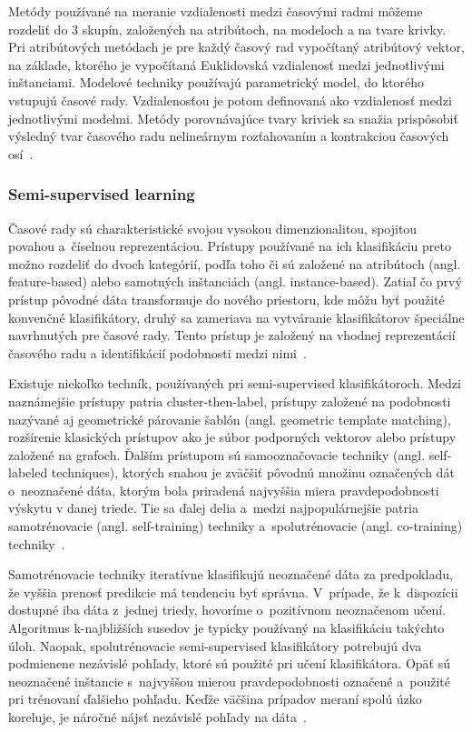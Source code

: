 \documentclass[a4paper,twoside,slovak,12pt]{article}
\begin{document}
Metódy používané na meranie vzdialenosti medzi časovými radmi môžeme rozdeliť do
3 skupín, založených na atribútoch, na modeloch a na tvare krivky. Pri
atribútových metódach je pre každý časový rad vypočítaný atribútový vektor, na
základe, ktorého je vypočítaná Euklidovská vzdialenosť medzi jednotlivými
inštanciami. Modelové techniky používajú parametrický model, do ktorého vstupujú
časové rady. Vzdialenosťou je potom definovaná ako vzdialenosť medzi
jednotlivými modelmi. Metódy porovnávajúce tvary kriviek sa snažia prispôsobiť
výsledný tvar časového radu nelineárnym rozťahovaním a kontrakciou časových
osí~\cite{Hautamaki2008}.


\subsubsection{Semi-supervised learning}
Časové rady sú charakteristické svojou vysokou dimenzionalitou, spojitou povahou
a~číselnou reprezentáciou. Prístupy používané na ich klasifikáciu preto možno
rozdeliť do dvoch kategórií, podľa toho či sú založené na atribútoch (angl.
feature-based) alebo samotných inštanciách (angl. instance-based). Zatiaľ čo
prvý prístup pôvodné dáta transformuje do nového priestoru, kde môžu byť použité
konvenčné klasifikátory, druhý sa zameriava na vytváranie klasifikátorov
špeciálne navrhnutých pre časové rady. Tento prístup je založený na vhodnej
reprezentácií časového radu a identifikácií podobnosti medzi
nimi~\cite{Gonzalez2017}.

Existuje niekoľko techník, používaných pri semi-supervised klasifikátoroch.
Medzi naznámejšie prístupy patria cluster-then-label, prístupy založené na
podobnosti nazývané aj geometrické párovanie šablón (angl. geometric template
matching), rozšírenie klasických prístupov ako je súbor podporných vektorov
alebo prístupy založené na grafoch. Ďalším prístupom sú samooznačovacie techniky
(angl. self-labeled techniques), ktorých snahou je zväčšiť pôvodnú množinu
označených dát o~neoznačené dáta, ktorým bola priradená najvyššia miera
pravdepodobnosti výskytu v danej triede. Tie sa ďalej delia a~medzi
najpopulárnejšie patria samotrénovacie (angl. self-training) techniky
a~spolutrénovacie (angl. co-training) techniky~\cite{Gonzalez2017}.

Samotrénovacie techniky iteratívne klasifikujú neoznačené dáta za predpokladu,
že vyššia prenosť predikcie má tendenciu byť správna. V~prípade, že k~dispozícii
dostupné iba dáta z~jednej triedy, hovoríme o~pozitívnom neoznačenom učení.
Algoritmus k-najbližších susedov je typicky používaný na klasifikáciu takýchto
úloh. Naopak, spolutrénovacie semi-supervised klasifikátory potrebujú dva
podmienene nezávislé pohľady, ktoré sú použité pri učení klasifikátora. Opäť sú
neoznačené inštancie s~najvyššou mierou pravdepodobnosti označené a~použité pri
trénovaní ďalšieho pohľadu. Keďže väčšina prípadov meraní spolú úzko koreluje,
je náročné nájsť nezávislé pohľady na dáta~\cite{Gonzalez2017}.
\end{document}
